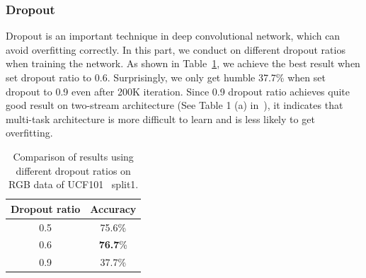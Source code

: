 \documentclass[10pt,twocolumn,letterpaper]{article}
\begin{document}
\subsubsection{Dropout}
Dropout is an important technique in deep convolutional network, which can avoid overfitting correctly. In this part, we conduct on different dropout ratios when training the network. As shown in Table~\ref{table:dropout}, we achieve the best result when set dropout ratio to 0.6. Surprisingly, we only get humble 37.7\% when set dropout to 0.9 even after 200K iteration. Since 0.9 dropout ratio achieves quite good result on two-stream architecture (See Table 1 (a) in~\cite{simonyan2014two}), it indicates that multi-task architecture is more difficult to learn and is  less likely to get overfitting. 
\begin{table}
	\begin{center}
		\begin{tabular}{|c|c|}
			\hline
			Dropout ratio 							& Accuracy \\		
			\hline												
			0.5										& 75.6\% \\
			0.6										& \textbf{76.7}\% \\
			0.9										& 37.7\% \\
			\hline																				
		\end{tabular}
	\end{center}
	\caption{Comparison of results using different dropout ratios on RGB data of UCF101~\cite{soomro2012ucf101} split1. }
	\label{table:dropout}
\end{table}
\end{document}
